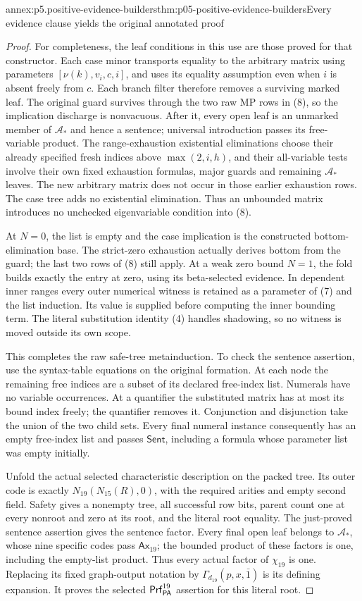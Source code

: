 \begin{annexitem}{annex:p5.positive-evidence-builders}{thm:p05-positive-evidence-builders}{Every evidence clause yields the original annotated proof}
\begin{proof}
For completeness, the leaf conditions in this use are those proved
for that constructor. Each case minor transports equality to the
arbitrary matrix using parameters \([\nu(k),v_i,c,i]\), and uses
its equality assumption even when \(i\) is absent freely from
\(c\). Each branch filter therefore removes a surviving marked
leaf. The original guard survives through the two raw MP rows in
(8), so the implication discharge is nonvacuous. After it, every
open leaf is an unmarked member of \(\mathcal A_*\) and hence
a sentence; universal introduction passes its free-variable product.
The range-exhaustion existential eliminations choose their already
specified fresh indices above \(\max(2,i,h)\), and their
all-variable tests involve their own fixed exhaustion formulas,
major guards and remaining \(\mathcal A_*\) leaves. The new
arbitrary matrix does not occur in those earlier exhaustion rows.
The case tree adds no existential elimination. Thus an unbounded
matrix introduces no unchecked eigenvariable condition into (8).

At \(N=0\), the list is empty and the case implication is the
constructed bottom-elimination base. The strict-zero exhaustion
actually derives bottom from the guard; the last two rows of (8)
still apply. At a weak zero bound \(N=1\), the fold builds exactly
the entry at zero, using its beta-selected evidence. In dependent
inner ranges every outer numerical witness is retained as a parameter
of (7) and the list induction. Its value is supplied before computing
the inner bounding term. The literal substitution identity (4)
handles shadowing, so no witness is moved outside its own scope.

This completes the raw safe-tree metainduction. To check the sentence
assertion, use the syntax-table equations on the original formation.
At each node the remaining free indices are a subset of its declared
free-index list. Numerals have no variable occurrences. At a
quantifier the substituted matrix has at most its bound index freely;
the quantifier removes it. Conjunction and disjunction take the union
of the two child sets. Every final numeral instance consequently has
an empty free-index list and passes \(\mathsf{Sent}\), including
a formula whose parameter list was empty initially.

Unfold the actual selected characteristic description on the packed
tree. Its outer code is exactly \(N_{19}(N_{15}(R),0)\), with
the required arities and empty second field. Safety gives a nonempty
tree, all successful row bits, parent count one at every nonroot and
zero at its root, and the literal root equality. The just-proved
sentence assertion gives the sentence factor. Every final open leaf
belongs to \(\mathcal A_*\), whose nine specific codes pass
\(\mathsf{Ax}_{19}\); the bounded product of these factors is one,
including the empty-list product. Thus every actual factor of
\(\chi_{19}\) is one. Replacing its fixed graph-output notation
by \(\Gamma_{d_{19}}(p,x,\bar1)\) is its defining expansion.
It proves the selected \(\mathsf{Prf}^{19}_{\mathsf{PA}}\) assertion
for this literal root.


\end{proof}
\end{annexitem}
